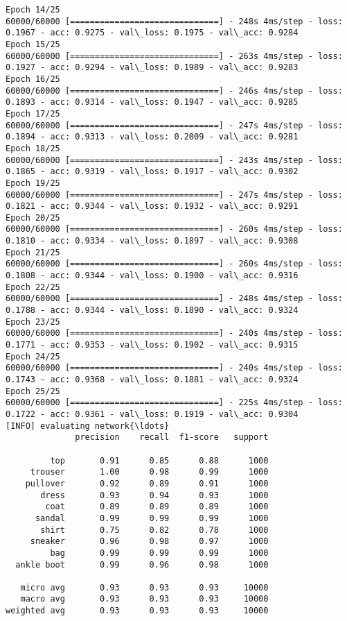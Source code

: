 \documentclass[11pt]{article}
\begin{document}
\begin{Verbatim}[commandchars=\\\{\}]
Epoch 14/25
60000/60000 [==============================] - 248s 4ms/step - loss: 0.1967 - acc: 0.9275 - val\_loss: 0.1975 - val\_acc: 0.9284
Epoch 15/25
60000/60000 [==============================] - 263s 4ms/step - loss: 0.1927 - acc: 0.9294 - val\_loss: 0.1989 - val\_acc: 0.9283
Epoch 16/25
60000/60000 [==============================] - 246s 4ms/step - loss: 0.1893 - acc: 0.9314 - val\_loss: 0.1947 - val\_acc: 0.9285
Epoch 17/25
60000/60000 [==============================] - 247s 4ms/step - loss: 0.1894 - acc: 0.9313 - val\_loss: 0.2009 - val\_acc: 0.9281
Epoch 18/25
60000/60000 [==============================] - 243s 4ms/step - loss: 0.1865 - acc: 0.9319 - val\_loss: 0.1917 - val\_acc: 0.9302
Epoch 19/25
60000/60000 [==============================] - 247s 4ms/step - loss: 0.1821 - acc: 0.9344 - val\_loss: 0.1932 - val\_acc: 0.9291
Epoch 20/25
60000/60000 [==============================] - 260s 4ms/step - loss: 0.1810 - acc: 0.9334 - val\_loss: 0.1897 - val\_acc: 0.9308
Epoch 21/25
60000/60000 [==============================] - 260s 4ms/step - loss: 0.1808 - acc: 0.9344 - val\_loss: 0.1900 - val\_acc: 0.9316
Epoch 22/25
60000/60000 [==============================] - 248s 4ms/step - loss: 0.1788 - acc: 0.9344 - val\_loss: 0.1890 - val\_acc: 0.9324
Epoch 23/25
60000/60000 [==============================] - 240s 4ms/step - loss: 0.1771 - acc: 0.9353 - val\_loss: 0.1902 - val\_acc: 0.9315
Epoch 24/25
60000/60000 [==============================] - 240s 4ms/step - loss: 0.1743 - acc: 0.9368 - val\_loss: 0.1881 - val\_acc: 0.9324
Epoch 25/25
60000/60000 [==============================] - 225s 4ms/step - loss: 0.1722 - acc: 0.9361 - val\_loss: 0.1919 - val\_acc: 0.9304
[INFO] evaluating network{\ldots}
              precision    recall  f1-score   support

         top       0.91      0.85      0.88      1000
     trouser       1.00      0.98      0.99      1000
    pullover       0.92      0.89      0.91      1000
       dress       0.93      0.94      0.93      1000
        coat       0.89      0.89      0.89      1000
      sandal       0.99      0.99      0.99      1000
       shirt       0.75      0.82      0.78      1000
     sneaker       0.96      0.98      0.97      1000
         bag       0.99      0.99      0.99      1000
  ankle boot       0.99      0.96      0.98      1000

   micro avg       0.93      0.93      0.93     10000
   macro avg       0.93      0.93      0.93     10000
weighted avg       0.93      0.93      0.93     10000


    \end{Verbatim}
\end{document}
